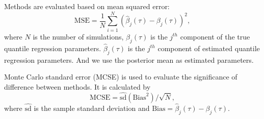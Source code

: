 \documentclass[12pt]{article}
\begin{document}
Methods are evaluated based on mean squared error:
\begin{displaymath}
  \mbox{MSE}  =  \frac{1}{N}\sum_{i = 1}^N (\hat{\beta}_j(\tau) -
  \beta_j(\tau))^2 ,
\end{displaymath}
where $N$ is the number of simulations, $\beta_j(\tau)$ is the
$j^{th}$ component of the true quantile regression
parameters. $\hat{\beta}_j(\tau)$ is the $j^{th}$ component of
estimated quantile regression parameters. And we use the posterior
mean as estimated parameters.

Monte Carlo standard error (MCSE) is used to evaluate the significance
of difference between methods. It is calculated by
\begin{displaymath}
  \mbox{MCSE} = \hat{\mbox{sd}}(\mbox{Bias}^2)/\sqrt{N},
\end{displaymath}
where $\hat{\mbox{sd}}$ is the sample standard deviation and
$\mbox{Bias} = \hat{\beta}_{j}(\tau) - \beta_{j}(\tau)$.
\end{document}
